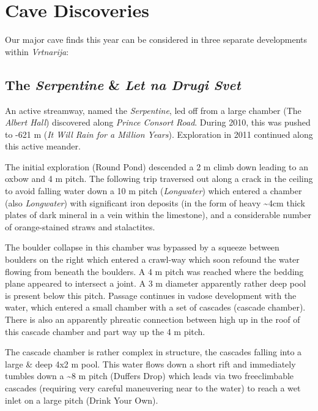\hypertarget{cave-discoveries}{%
\section{Cave Discoveries}\label{cave-discoveries}}

Our major cave finds this year can be considered in three separate
developments within \emph{Vrtnarija}:

\hypertarget{the-serpentine-let-na-drugi-svet}{%
\subsection{\texorpdfstring{The \emph{Serpentine} \& \emph{Let na Drugi
Svet}}{The Serpentine \& Let na Drugi Svet}}\label{the-serpentine-let-na-drugi-svet}}

An active streamway, named the \emph{Serpentine}, led off from a large
chamber (The \emph{Albert Hall}) discovered along \emph{Prince Consort
Road}. During 2010, this was pushed to -621 m (\emph{It Will Rain for a
Million Years}). Exploration in 2011 continued along this active
meander.

The initial exploration (Round Pond) descended a 2 m climb down leading
to an oxbow and 4 m pitch. The following trip traversed out along a
crack in the ceiling to avoid falling water down a 10 m pitch
(\emph{Longwater}) which entered a chamber (also \emph{Longwater}) with
significant iron deposits (in the form of heavy \textasciitilde 4cm
thick plates of dark mineral in a vein within the limestone), and a
considerable number of orange-stained straws and stalactites.

The boulder collapse in this chamber was bypassed by a squeeze between
boulders on the right which entered a crawl-way which soon refound the
water flowing from beneath the boulders. A 4 m pitch was reached where
the bedding plane appeared to intersect a joint. A 3 m diameter
apparently rather deep pool is present below this pitch. Passage
continues in vadose development with the water, which entered a small
chamber with a set of cascades (cascade chamber). There is also an
apparently phreatic connection between high up in the roof of this
cascade chamber and part way up the 4 m pitch.

The cascade chamber is rather complex in structure, the cascades falling
into a large \& deep 4x2 m pool. This water flows down a short rift and
immediately tumbles down a \textasciitilde 8 m pitch (Duffers Drop)
which leads via two freeclimbable cascades (requiring very careful
maneuvering near to the water) to reach a wet inlet on a large pitch
(Drink Your Own).

